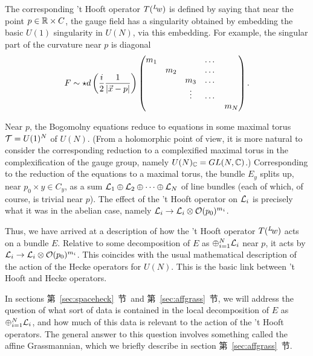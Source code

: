 The corresponding 't Hooft operator $T(^L\negthinspace w)$ is
defined by saying that near the point $p\in  \Bbb{R}\times C$, the
gauge field has a singularity obtained by embedding the basic
$U(1)$ singularity in $U(N)$, via this embedding.  For example,
the singular part of the curvature near $p$ is diagonal
\setcounter{equation}{11}
\begin{equation}\label{eq:orphy}
F\sim \star d\left({i\over 2}{1\over |\vec x -
p|}\right) \left(\begin{matrix}m_1& & & \dots & \\
                                    & m_2& & \dots & \\
                          & & m_3 &\dots & \\
                & & \vdots & \dots& \\
            & & & & m_N\\\end{matrix}\right).
\end{equation}

Near $p$, the Bogomolny equations reduce to equations in some
maximal torus ${\cal T}=U(1)^N$ of $U(N)$. (From a holomorphic
point of view, it is more natural to consider the corresponding
reduction to a complexified maximal torus in the complexification
of the gauge group, namely $U(N)_{\Bbb{C}}=GL(N,\Bbb{C})$.)
Corresponding to the reduction of the equations to a maximal
torus, the bundle $E_y$ splits up, near $p_0\times y \in C_y$, as
a sum ${\cal L}_1\oplus {\cal L}_2\oplus\dots \oplus {\cal L}_N$
of line bundles (each of which, of course, is trivial near $p$).
The effect of the 't Hooft operator on ${\cal L}_i$ is precisely
what it was in the abelian case, namely ${\cal L}_i\to {\cal
L}_i\otimes {\cal O}(p_0)^{m_i}$.

Thus, we have arrived at a description of how the 't Hooft
operator $T(^L\negthinspace w)$  acts on a bundle $E$.  Relative
to some decomposition of $E$ as $\oplus_{i=1}^N{\cal L}_i$ near
$p$, it acts by ${\cal L}_i\to {\cal L}_i\otimes {\cal
O}(p_0)^{m_i}$. This coincides with the usual mathematical
description of the action of the Hecke operators for $U(N)$.
This is the basic link between 't Hooft and Hecke operators.

In sections 第~\ref{sec:spaceheck}~节\ and 第~\ref{sec:affgrass}~节, we will address the
question of what sort of data is contained in the local
decomposition of $E$ as $\oplus_{i=1}^N{\cal L}_i$, and how much
of this data is relevant to the action of the 't Hooft operators.
The general answer to this question involves something called the
affine Grassmannian, which we briefly describe in section
第~\ref{sec:affgrass}~节.

